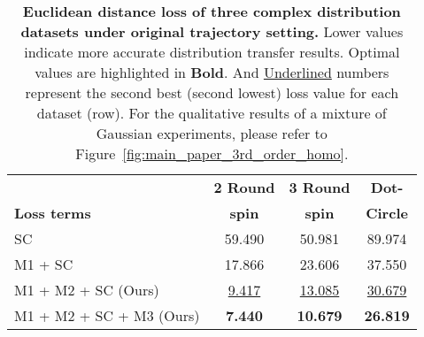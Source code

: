 \begin{table}[!ht] 
\centering
\caption{
\textbf{Euclidean distance loss of three complex distribution datasets under original trajectory setting.} Lower values indicate more accurate distribution transfer results. Optimal values are highlighted in \textbf{Bold}. And \underline{Underlined} numbers represent the second best (second lowest) loss value for each dataset (row). 
For the qualitative results of a mixture of Gaussian experiments, please refer to Figure~\ref{fig:main_paper_3rd_order_homo}.
}
\label{tab:euclidean_distance_complex_datasets_complex}
\small
\begin{tabular}{l|c|c|c}
\toprule
& \textbf{2 Round} & \textbf{3 Round} & \textbf{Dot-} \\
\textbf{Loss terms}  & \textbf{spin} & \textbf{spin} & \textbf{Circle} \\
\midrule
SC              & 59.490 & 50.981 & 89.974 \\
M1 + SC \cite{fhla24}       & 17.866 & 23.606 & 37.550 \\
M1 + M2 + SC (Ours)     & \underline{9.417} & \underline{13.085} & \underline{30.679} \\
M1 + M2 + SC + M3	(Ours)	& \textbf{7.440} & \textbf{10.679} & \textbf{26.819} \\
\bottomrule
\end{tabular}
\end{table}
